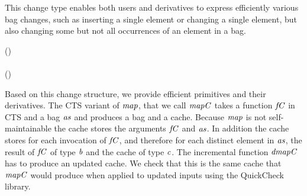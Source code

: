 This change type enables both users and derivatives to express efficiently various bag
changes, such as inserting a single element or changing a single element, but
also changing some but not all occurrences of an element in a bag.

\begin{hscode}\SaveRestoreHook
{}%
%
\>[B]{}\mathrel{:\mkern-1mu:}\to \Delta (\;){}\<[E]%
\\
\>[B]{}\;\mathrel{=}\<[E]%
\\[\blanklineskip]%
\>[B]{}\mathrel{:\mkern-1mu:}\to \Delta {}\to \Delta (\;){}\<[E]%
\\
\>[B]{}\;\;\mathrel{=}\<[E]%
\ColumnHook
\end{hscode}\resethooks

Based on this change structure, we provide efficient primitives and their
derivatives. The CTS variant of \ensuremath{\Varid{map}}, that we call \ensuremath{\Varid{mapC}} takes a function
\ensuremath{\Varid{fC}} in CTS and a bag \ensuremath{\Varid{as}} and produces a bag and a cache. Because \ensuremath{\Varid{map}} is not
self-maintainable the cache stores the arguments \ensuremath{\Varid{fC}} and \ensuremath{\Varid{as}}. In addition the
cache stores for each invocation of \ensuremath{\Varid{fC}}, and therefore for each distinct element
in \ensuremath{\Varid{as}}, the result of \ensuremath{\Varid{fC}} of type \ensuremath{\Varid{b}} and the cache of type \ensuremath{\Varid{c}}.
The incremental function \ensuremath{\Varid{dmapC}} has to produce an
updated cache. We check that this is the same cache that \ensuremath{\Varid{mapC}} would produce
when applied to updated inputs using the QuickCheck library.

